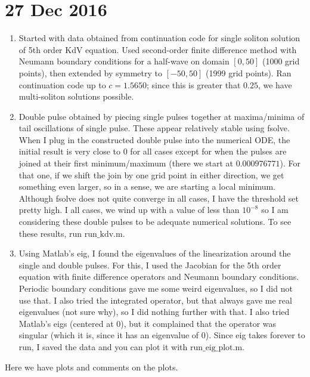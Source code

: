 \documentclass[12pt]{article}
\begin{document}
\section*{27 Dec 2016}

\begin{enumerate}
	\item Started with data obtained from continuation code for single soliton solution of 5th order KdV equation. Used second-order finite difference method with Neumann boundary conditions for a half-wave on domain $[0, 50]$ (1000 grid points), then extended by symmetry to $[-50,50]$ (1999 grid points). Ran continuation code up to $c = 1.5650$; since this is greater that $0.25$, we have multi-soliton solutions possible.
	\item Double pulse obtained by piecing single pulses together at maxima/minima of tail oscillations of single pulse. These appear relatively stable using fsolve. When I plug in the constructed double pulse into the numerical ODE, the initial result is very close to 0 for all cases except for when the pulses are joined at their first minimum/maximum (there we start at $0.000976771$). For that one, if we shift the join by one grid point in either direction, we get something even larger, so in a sense, we are starting a local minimum. Although fsolve does not quite converge in all cases, I have the threshold set pretty high. I all cases, we wind up with a value of less than $10^{-8}$ so I am considering these double pulses to be adequate numerical solutions. To see these results, run $\textrm{run\_kdv.m}$.
	\item Using Matlab's eig, I found the eigenvalues of the linearization around the single and double pulses. For this, I used the Jacobian for the 5th order equation with finite difference operators and Neumann boundary conditions. Periodic boundary conditions gave me some weird eigenvalues, so I did not use that. I also tried the integrated operator, but that always gave me real eigenvalues (not sure why), so I did nothing further with that. I also tried Matlab's eigs (centered at 0), but it complained that the operator was singular (which it is, since it has an eigenvalue of 0). Since eig takes forever to run, I saved the data and you can plot it with $\textrm{run\_eig\_plot.m}$.
\end{enumerate}

Here we have plots and comments on the plots.
\end{document}
